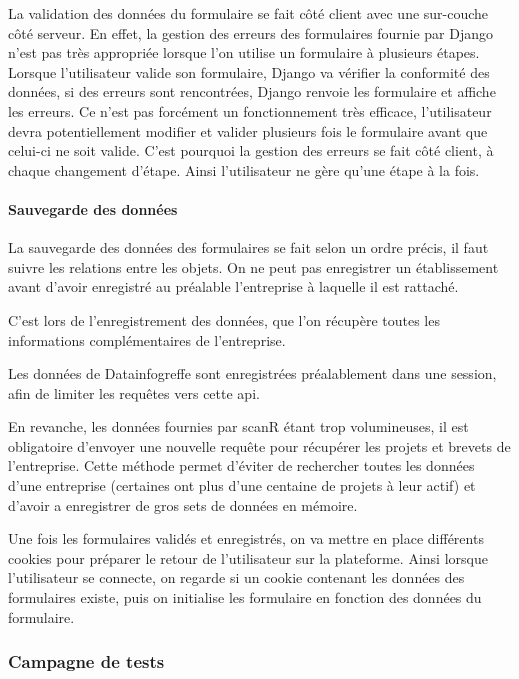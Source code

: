\documentclass[french]{article}
\begin{document}
{La validation des données du formulaire se fait côté client avec une sur-couche côté serveur. En effet, la gestion des erreurs des formulaires fournie par Django n'est pas très appropriée lorsque l'on utilise un formulaire à plusieurs étapes. Lorsque l'utilisateur valide son formulaire, Django va vérifier la conformité des données, si des erreurs sont rencontrées, Django renvoie les formulaire et affiche les erreurs. Ce n'est pas forcément un fonctionnement très efficace, l'utilisateur devra potentiellement modifier et valider plusieurs fois le formulaire avant que celui-ci ne soit valide. C'est pourquoi la gestion des erreurs se fait côté client, à chaque changement d'étape. Ainsi l'utilisateur ne gère qu'une étape à la fois.

\paragraph{Sauvegarde des données}

La sauvegarde des données des formulaires se fait selon un ordre précis, il faut suivre les relations entre les objets. On ne peut pas enregistrer un établissement avant d'avoir enregistré au préalable l'entreprise à laquelle il est rattaché.

C'est lors de l'enregistrement des données, que l'on récupère toutes les informations complémentaires de l'entreprise.

Les données de Datainfogreffe sont enregistrées préalablement dans une session, afin de limiter les requêtes vers cette api.

En revanche, les données fournies par scanR étant trop volumineuses, il est obligatoire d'envoyer une nouvelle requête pour récupérer les projets et brevets de l'entreprise. Cette méthode permet d'éviter de rechercher toutes les données d'une entreprise (certaines ont plus d'une centaine de projets à leur actif) et d'avoir a enregistrer de gros sets de données en mémoire.

Une fois les formulaires validés et enregistrés, on va mettre en place différents cookies pour préparer le retour de l'utilisateur sur la plateforme. Ainsi lorsque l'utilisateur se connecte, on regarde si un cookie contenant les données des formulaires existe, puis on initialise les formulaire en fonction des données du formulaire.

\subsubsection{Campagne de tests}

}
\end{document}
